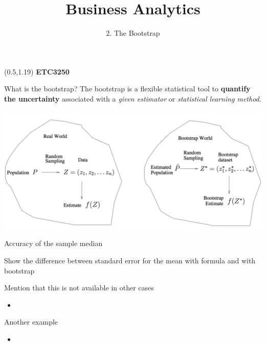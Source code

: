 \documentclass[14pt]{beamer}
\title[2. The Bootstrap]{Business Analytics}
\author{2. The Bootstrap}
\begin{document}
\begin{frame}[plain]{}
\maketitle
\begin{textblock}{11}(0.5,1.19){\color{white}\large
\textbf{ETC3250}}
\end{textblock}
\end{frame}

\begin{frame}[plain]{What is the bootstrap?}
%
The bootstrap is a flexible statistical tool to \textbf{quantify the uncertainty} associated with a \emph{given estimator} or \emph{statistical learning method}.
\begin{center}
\includegraphics[width=1\textwidth]{general-bootstrap}	
\end{center}
\end{frame}


\begin{frame}[plain]{Accuracy of the sample median}

Show the difference between standard error for the mean with formula and with bootstrap

Mention that this is not available in other cases

\begin{itemize}
	\item 
\end{itemize}
\end{frame}

\begin{frame}[plain]{Another example}

\begin{itemize}
	\item
\end{itemize}
\end{frame}
\end{document}
